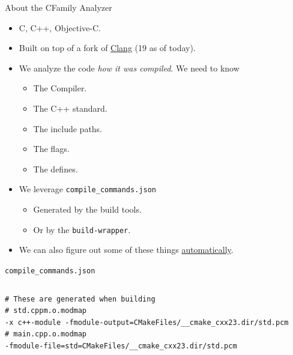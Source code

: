 \documentclass[aspectratio=169]{beamer}
\begin{document}
\begin{frame}[t]{About the CFamily Analyzer}
  \begin{block}{}
    \begin{itemize}
      \item C, C++, Objective-C.
      \item Built on top of a fork of \href{https://clang.llvm.org/}{Clang} (19 as of today).
      \item We analyze the code \emph{how it was compiled}. We need to know
            \begin{itemize}
              \item The Compiler.
              \item The C++ standard.
              \item The include paths.
              \item The flags.
              \item The defines.
            \end{itemize}
      \item We leverage \texttt{compile\_commands.json}
            \begin{itemize}
              \item Generated by the build tools.
              \item Or by the \texttt{build-wrapper}.
            \end{itemize}
      \item We can also figure out some of these things \href{https://docs.sonarsource.com/sonarqube-cloud/advanced-setup/automatic-analysis}{automatically}. 
    \end{itemize}
  \end{block}
\end{frame}

\begin{frame}[fragile]{\texttt{compile\_commands.json}}
  \inputminted[breaklines]{json}{snippets/compdb/compile_commands.json}
  \begin{verbatim}
# These are generated when building
# std.cppm.o.modmap
-x c++-module -fmodule-output=CMakeFiles/__cmake_cxx23.dir/std.pcm
# main.cpp.o.modmap
-fmodule-file=std=CMakeFiles/__cmake_cxx23.dir/std.pcm
  \end{verbatim}
\end{frame}
\end{document}
